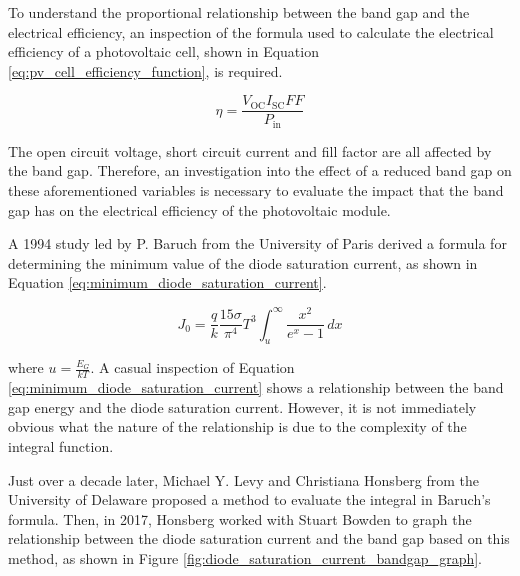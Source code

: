 To understand the proportional relationship between the band gap and the electrical efficiency, an inspection of the formula used to calculate the electrical efficiency of a photovoltaic cell, shown in Equation \ref{eq:pv_cell_efficiency_function}, is required. \cite{HonsbergSolarEfficiency}

\begin{equation}
    \eta = \frac{V_\text{OC}I_\text{SC}FF}{P_\text{in}}
    \label{eq:pv_cell_efficiency_function}
\end{equation}

The open circuit voltage, short circuit current and fill factor are all affected by the band gap. Therefore, an investigation into the effect of a reduced band gap on these aforementioned variables is necessary to evaluate the impact that the band gap has on the electrical efficiency of the photovoltaic module.\vspace{0.5em}

A 1994 study led by P. Baruch from the University of Paris derived a formula for determining the minimum value of the diode saturation current, as shown in Equation \ref{eq:minimum_diode_saturation_current}.

\begin{equation}
    J_0 = \frac{q}{k} \frac{15\sigma}{\pi^4} T^3 \int_{u}^{\infty} \frac{x^2}{e^x - 1}\,dx
    \label{eq:minimum_diode_saturation_current}
\end{equation}

where $u = \frac{E_G}{kT}$. \cite{Baruch1995OnConversion} A casual inspection of Equation \ref{eq:minimum_diode_saturation_current} shows a relationship between the band gap energy and the diode saturation current. However, it is not immediately obvious what the nature of the relationship is due to the complexity of the integral function.\vspace{0.5em}

Just over a decade later, Michael Y. Levy and Christiana Honsberg from the University of Delaware proposed a method to evaluate the integral in Baruch's formula. \cite{Levy2006RapidApplications} Then, in 2017, Honsberg worked with Stuart Bowden to graph the relationship between the diode saturation current and the band gap based on this method, as shown in Figure \ref{fig:diode_saturation_current_bandgap_graph}.

